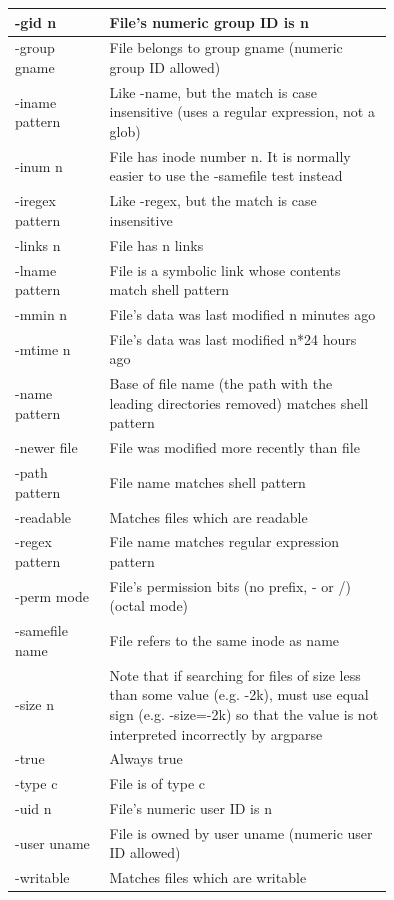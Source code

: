 \begin{longtable}{|l|p{0.75\linewidth}|}
  \hline
  -gid n & File's numeric group ID is n \\
  \hline
  -group gname & File belongs to group gname (numeric group ID allowed) \\
  \hline
  -iname pattern & Like -name, but the match is case insensitive (uses
  a regular expression, not a glob) \\
  \hline
  -inum n & File has inode number n. It is normally easier to use the
  -samefile test instead \\
  \hline
  -iregex pattern & Like -regex, but the match is case insensitive \\
  \hline
  -links n & File has n links \\
  \hline
  -lname pattern & File is a symbolic link whose contents match shell pattern \\
  \hline
  -mmin n & File's data was last modified n minutes ago \\
  \hline
  -mtime n & File's data was last modified n*24 hours ago \\
  \hline
  -name pattern & Base of file name (the path with the leading
  directories removed) matches shell pattern \\
  \hline
  -newer file & File was modified more recently than file \\
  \hline
  -path pattern & File name matches shell pattern \\
  \hline
  -readable & Matches files which are readable \\
  \hline
  -regex pattern & File name matches regular expression pattern \\
  \hline
  -perm mode & File's permission bits (no prefix, - or /) (octal mode) \\
  \hline
  -samefile name & File refers to the same inode as name \\
  \hline
  -size n & Note that if searching for files of size less
  than some value (e.g. -2k), must use equal sign (e.g. -size=-2k) so
  that the value is not interpreted incorrectly by argparse \\
  \hline
  -true & Always true \\
  \hline
  -type c & File is of type c \\
  \hline
  -uid n & File's numeric user ID is n \\
  \hline
  -user uname & File is owned by user uname (numeric user ID allowed) \\
  \hline
  -writable & Matches files which are writable \\
  \hline

\end{longtable}
